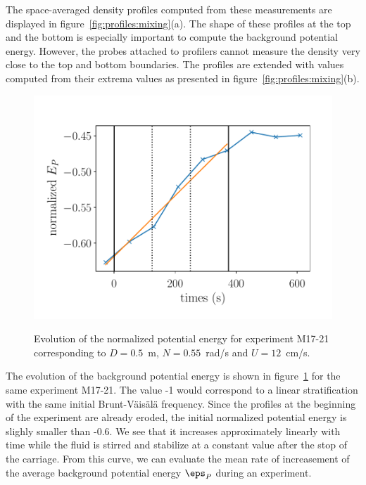 The space-averaged density profiles computed from these measurements are
displayed in figure~\ref{fig:profiles:mixing}(a). The shape of these profiles
at the top and the bottom is especially important to compute the background
potential energy. However, the probes attached to profilers cannot measure the
density very close to the top and bottom boundaries. The profiles are extended
with values computed from their extrema values as presented in
figure~\ref{fig:profiles:mixing}(b).

\begin{figure}
\includegraphics[width=\figwidth]{tmp/fig_energy_pot_vs_time}
\label{fig:energy:pot:vs:time}

\caption{Evolution of the normalized potential energy for experiment M17-21
corresponding to $D = 0.5$~m, $N=0.55$~rad/s and $U=12$~cm/s.}

\end{figure}

The evolution of the background potential energy is shown in
figure~\ref{fig:energy:pot:vs:time} for the same experiment M17-21. The value
-1 would correspond to a linear stratification with the same initial
Brunt-V\"ais\"al\"a frequency. Since the profiles at the beginning of the
experiment are already eroded, the initial normalized potential energy is
slighly smaller than -0.6. We see that it increases approximately linearly with
time while the fluid is stirred and stabilize at a constant value after the
stop of the carriage. From this curve, we can evaluate the mean rate of
increasement of the average background potential energy $\eps_P$ during an
experiment.


